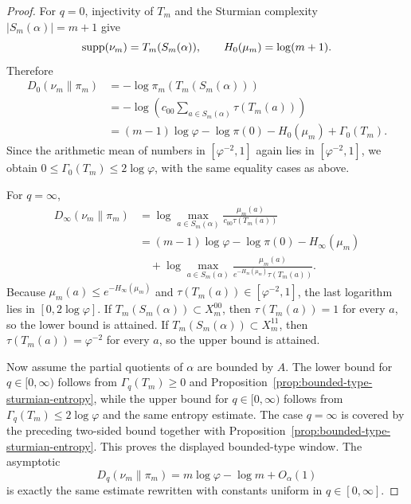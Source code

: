 \begin{proof}
For \(q=0\), injectivity of \(T_m\) and the Sturmian complexity
\(|S_m(\alpha)|=m+1\) give
\[
\operatorname{supp}(\nu_m)=T_m(S_m(\alpha)),
\qquad
H_0(\mu_m)=\log(m+1).
\]
Therefore
\[
\begin{aligned}
D_0(\nu_m\|\pi_m)
&=
-\log \pi_m(T_m(S_m(\alpha)))\\
&=
-\log\!\left(
c_{00}\sum_{a\in S_m(\alpha)}\tau(T_m(a))
\right)\\
&=
(m-1)\log\varphi-\log\pi(0)-H_0(\mu_m)+\Gamma_0(T_m).
\end{aligned}
\]
Since the arithmetic mean of numbers in \([\varphi^{-2},1]\) again lies in
\([\varphi^{-2},1]\), we obtain \(0\le\Gamma_0(T_m)\le2\log\varphi\), with the
same equality cases as above.

For \(q=\infty\),
\[
\begin{aligned}
D_\infty(\nu_m\|\pi_m)
&=
\log\max_{a\in S_m(\alpha)}
\frac{\mu_m(a)}{c_{00}\tau(T_m(a))}\\
&=
(m-1)\log\varphi-\log\pi(0)-H_\infty(\mu_m)\\
&\quad
+
\log\max_{a\in S_m(\alpha)}
\frac{\mu_m(a)}{e^{-H_\infty(\mu_m)}\tau(T_m(a))}.
\end{aligned}
\]
Because \(\mu_m(a)\le e^{-H_\infty(\mu_m)}\) and
\(\tau(T_m(a))\in[\varphi^{-2},1]\), the last logarithm lies in
\([0,2\log\varphi]\). If \(T_m(S_m(\alpha))\subset X_m^{00}\), then
\(\tau(T_m(a))=1\) for every \(a\), so the lower bound is attained. If
\(T_m(S_m(\alpha))\subset X_m^{11}\), then \(\tau(T_m(a))=\varphi^{-2}\) for
every \(a\), so the upper bound is attained.

Now assume the partial quotients of \(\alpha\) are bounded by \(A\). The lower
bound for \(q\in[0,\infty)\) follows from \(\Gamma_q(T_m)\ge0\) and
Proposition~\ref{prop:bounded-type-sturmian-entropy}, while the upper bound for
\(q\in[0,\infty)\) follows from \(\Gamma_q(T_m)\le2\log\varphi\) and the same
entropy estimate. The case \(q=\infty\) is covered by the preceding
two-sided bound together with Proposition~\ref{prop:bounded-type-sturmian-entropy}.
This proves the displayed bounded-type window. The asymptotic
\[
D_q(\nu_m\|\pi_m)=m\log\varphi-\log m+O_\alpha(1)
\]
is exactly the same estimate rewritten with constants uniform in
\(q\in[0,\infty]\).
\end{proof}
